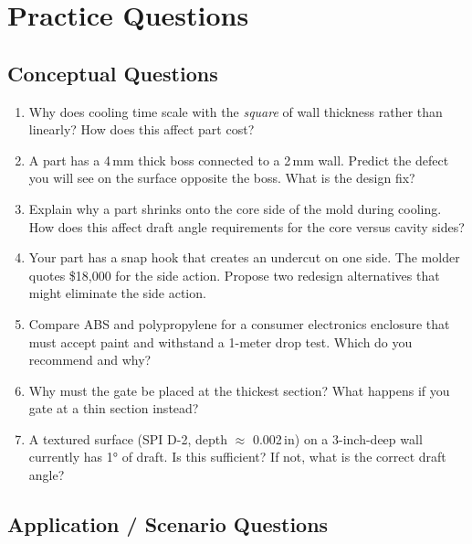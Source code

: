 \section{Practice Questions}
\label{sec:practice_b}

\subsection{Conceptual Questions}

\begin{enumerate}[leftmargin=1.5em]
  \item Why does cooling time scale with the \emph{square} of wall thickness rather than linearly? How does this affect part cost?

  \item A part has a 4\,mm thick boss connected to a 2\,mm wall. Predict the defect you will see on the surface opposite the boss. What is the design fix?

  \item Explain why a part shrinks onto the core side of the mold during cooling. How does this affect draft angle requirements for the core versus cavity sides?

  \item Your part has a snap hook that creates an undercut on one side. The molder quotes \$18,000 for the side action. Propose two redesign alternatives that might eliminate the side action.

  \item Compare ABS and polypropylene for a consumer electronics enclosure that must accept paint and withstand a 1-meter drop test. Which do you recommend and why?

  \item Why must the gate be placed at the thickest section? What happens if you gate at a thin section instead?

  \item A textured surface (SPI D-2, depth $\approx$ 0.002\,in) on a 3-inch-deep wall currently has \ang{1} of draft. Is this sufficient? If not, what is the correct draft angle?
\end{enumerate}

\subsection{Application / Scenario Questions}

